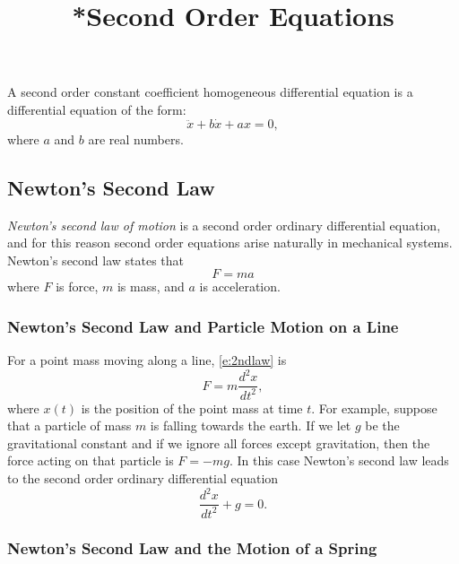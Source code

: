 \documentclass{ximera}
\title{*Second Order Equations}
\begin{document}
\begin{abstract}
\end{abstract}
\maketitle

  \label{S:SOE}

A second order constant coefficient
homogeneous differential equation
is a differential equation of the form:
\begin{equation} \label{eq:soex1}
\ddot{x} + b\dot{x} + ax = 0,
\end{equation}
where $a$ and $b$ are real numbers.

\subsection*{Newton's Second Law}

{\em Newton's second law of motion\/} is a second order ordinary
differential equation, and for this reason second order equations arise
naturally in mechanical systems.  Newton's second law states that
\begin{equation}  \label{e:2ndlaw}
F=ma
\end{equation}
where $F$ is force, $m$ is mass,
and $a$ is acceleration.

\subsubsection*{Newton's Second Law and Particle Motion on a Line}

For a point mass moving along a line, \eqref{e:2ndlaw} is
\begin{equation} \label{E:F=ma}
F=m\frac{d^2x}{dt^2},
\end{equation}
where $x(t)$ is the position of the point mass at time $t$.
For example, suppose that a particle of mass $m$ is falling towards
the earth.  If we let $g$ be the gravitational constant and if we
ignore all forces except gravitation, then the force acting on that
particle is $F=-mg$.  In this case Newton's second law leads to the
second order ordinary differential equation
\begin{equation} \label{e:pointpart}
\frac{d^2x}{dt^2}+g=0.
\end{equation}

\subsubsection*{Newton's Second Law and the Motion of a Spring}
 
\end{document}
